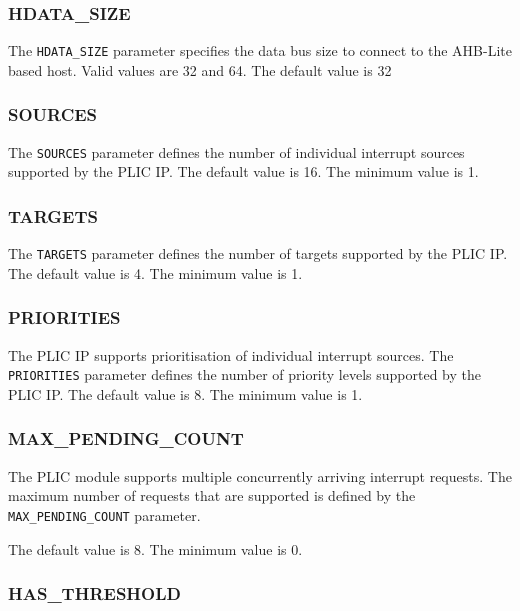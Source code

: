 \subsubsection{HDATA\_SIZE}

The \texttt{HDATA\_SIZE} parameter specifies the data bus size to
connect to the AHB-Lite based host. Valid values are 32 and 64. The
default value is 32

\hypertarget{SOURCES}{\subsubsection{SOURCES}\label{sec:SOURCES}}

The \texttt{SOURCES} parameter defines the number of individual
interrupt sources supported by the PLIC IP. The default value is 16. The
minimum value is 1.

\hypertarget{TARGETS}{\subsubsection{TARGETS}\label{sec:TARGETS}}

The \texttt{TARGETS} parameter defines the number of targets supported
by the PLIC IP. The default value is 4. The minimum value is 1.

\subsubsection{PRIORITIES}

\sloppy
The PLIC IP supports prioritisation of individual interrupt sources. The \texttt{PRIORITIES} parameter defines the number of priority levels supported by the PLIC IP. The default value is 8. The minimum value is 1.

\subsubsection{MAX\_PENDING\_COUNT}

\sloppy
The PLIC module supports multiple concurrently arriving interrupt
requests. The maximum number of requests that are supported is defined
by the \texttt{MAX\_PENDING\_COUNT} parameter.

The default value is 8. The minimum value is 0.

\subsubsection{HAS\_THRESHOLD}

